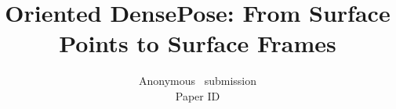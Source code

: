 \documentclass[10pt,twocolumn,letterpaper]{article}
\title{Oriented DensePose: From Surface Points to Surface Frames}
\author{Anonymous \confName~submission\\
Paper ID \paperID
}
\begin{document}
\maketitle

\begin{abstract}

\end{abstract}









{
    \small
    
    
}


\end{document}
